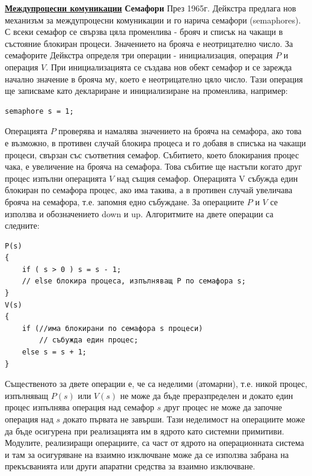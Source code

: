\documentclass{article}
\begin{document}
\textbf{\underline{Междупроцесни комуникации}} \newline\newline
\textbf{Семафори} \newline
През 1965г. Дейкстра предлага нов механизъм за междупроцесни комуникации и го нарича семафори (semaphores). С всеки семафор се свързва цяла променлива -
брояч и списък на чакащи в състояние блокиран процеси. Значението на брояча е неотрицателно число. За семафорите Дейкстра определя три операции -
инициализация, операция $P$ и операция $V$. При инициализацията се създава нов обект семафор и се зарежда начално значение в брояча му, което е неотрицателно
цяло число. Тази операция ще записваме като деклариране и инициализиране на променлива, например:
\begin{lstlisting}[style=CStyle]
semaphore s = 1;
\end{lstlisting}
Операцията $P$ проверява и намалява значението на брояча на семафора, ако това е възможно, в противен случай блокира процеса и го добавя в списъка на чакащи
процеси, свързан със съответния семафор. Събитието, което блокирания процес чака, е увеличение на брояча на семафора. Това събитие ще настъпи когато друг процес
изпълни операцията $V$ над същия семафор. Операцията V събужда един блокиран по семафора процес, ако има такива, а в противен случай увеличава брояча на семафора,
т.е. запомня едно събуждане. За операциите $P$ и $V$ се използва и обозначението down и up. Алгоритмите на двете операции са следните:
\begin{lstlisting}[style=CStyle]
P(s)
{
    if ( s > 0 ) s = s - 1;
    // else блокира процеса, изпълняващ P по семафора s;
}
V(s)
{
    if (//има блокирани по семафора s процеси)
        // събужда един процес;
    else s = s + 1;
}
\end{lstlisting}
Същественото за двете операции е, че са неделими (атомарни), т.е. никой процес, изпълняващ $P(s)$ или $V(s)$ не може да бъде преразпределен и докато един
процес изпълнява операция над семафор $s$ друг процес не може да започне операция над $s$ докато първата не завърши. Тази неделимост на операциите може да
бъде осигурена при реализацията им в ядрото като системни примитиви. Модулите, реализиращи операциите, са част от ядрото на операционната система и там за
осигуряване на взаимно изключване може да се използва забрана на прекъсванията или други апаратни средства за взаимно изключване.
\end{document}
